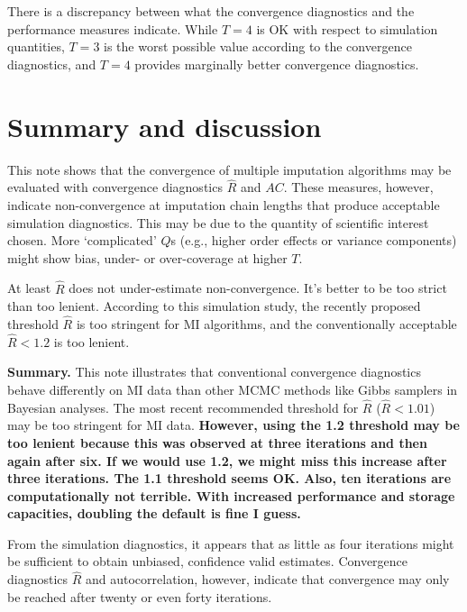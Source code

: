 \documentclass[article]{jss}
\begin{document}
There is a discrepancy between what the convergence diagnostics and the performance measures indicate. While $T=4$ is OK with respect to simulation quantities, $T=3$ is the worst possible value according to the convergence diagnostics, and $T=4$ provides marginally better convergence diagnostics. 



\section{Summary and discussion} \label{sec:summary}

This note shows that the convergence of multiple imputation algorithms may be evaluated with convergence diagnostics $\widehat{R}$ and $AC$. These measures, however, indicate non-convergence at imputation chain lengths that produce acceptable simulation diagnostics. This may be due to the quantity of scientific interest chosen. More `complicated' $Q$s (e.g., higher order effects or variance components) might show bias, under- or over-coverage at higher $T$. 

At least $\widehat{R}$ does not under-estimate non-convergence. It's better to be too strict than too lenient. According to this simulation study, the recently proposed threshold $\widehat{R}$ is too stringent for MI algorithms, and the conventionally acceptable $\widehat{R} <1.2$ is too lenient.     



\textbf{Summary.}
This note illustrates that conventional convergence diagnostics behave differently on MI data than other MCMC methods like Gibbs samplers in Bayesian analyses. The most recent recommended threshold for $\widehat{R}$ ($\widehat{R} < 1.01$) may be too stringent for MI data. \textbf{However, using the 1.2 threshold may be too lenient because this was observed at three iterations and then again after six. If we would use 1.2, we might miss this increase after three iterations. The 1.1 threshold seems OK. Also, ten iterations are computationally not terrible. With increased performance and storage capacities, doubling the default is fine I guess.}

From the simulation diagnostics, it appears that as little as four iterations might be sufficient to obtain unbiased, confidence valid estimates. Convergence diagnostics $\widehat{R}$ and autocorrelation, however, indicate that convergence may only be reached after twenty or even forty iterations. 
\end{document}
